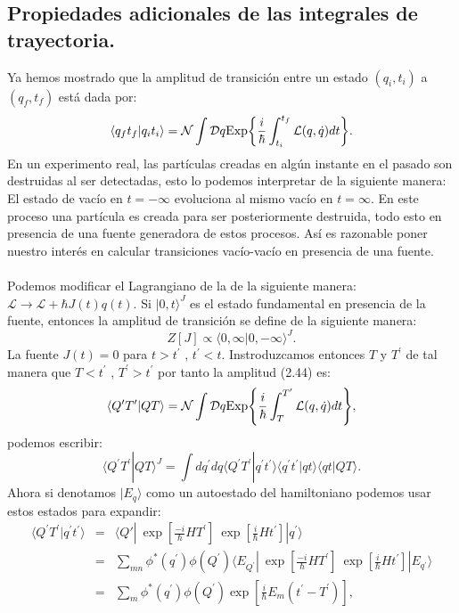 \subsection{Propiedades adicionales de las integrales de trayectoria.}
Ya hemos mostrado que la amplitud de transición entre un estado $(q_i,t_i)$ a $(q_f,t_f)$ está dada por:
\begin{equation}
\langle q_{f}t_{f}|q_it_i\rangle=\mathcal{N}\int\mathcal{D}q\text{Exp\ensuremath{\left\{ \frac{i}{\hbar}\int_{t_{i}}^{t_{f}}\mathcal{L}(q,\dot{q})dt\right\} }}.
\end{equation}
En un experimento real, las partículas creadas en algún instante en el pasado son destruidas al ser detectadas, esto lo podemos interpretar de la siguiente manera: El estado de vacío en $t=-\infty$ evoluciona al mismo vacío en $t=\infty$. En este proceso una partícula es creada para ser posteriormente destruida, todo esto en presencia de una fuente generadora de estos procesos. Así es razonable poner nuestro interés en calcular transiciones vacío-vacío en presencia de una fuente.\\
\\
Podemos modificar el Lagrangiano de la de la siguiente manera: $\mathcal{L} \to \mathcal{L}+\hbar J(t)q(t)$. Si $|0,t\rangle^J $ es el estado fundamental en presencia de la fuente, entonces la amplitud de transición se define de la siguiente manera:
\begin{equation}
Z[J]\propto \langle 0,\infty|0,-\infty\rangle ^J.
\end{equation}
La fuente $J(t)=0$ para $t>t^{\prime}$ , $t^{\prime} < t$. Instroduzcamos entonces $T$ y $T^{\prime} $ de tal manera que $T<t^{\prime} $ , $T^{\prime}>t^{\prime} $ por tanto la amplitud (2.44) es:
\begin{equation}
\langle 	Q^{\prime} T^{\prime} |QT\rangle=\mathcal{N}\int\mathcal{D}q\text{Exp\ensuremath{\left\{ \frac{i}{\hbar}\int_{T}^{T^{\prime}}\mathcal{L}(q,\dot{q})dt\right\} }},
\end{equation}
podemos escribir:
\begin{equation}
\langle Q^{\prime} T^{\prime} |QT \rangle^J=\int dq^{\prime} dq\langle Q^{\prime} T^{\prime} | q^{\prime} t^{\prime}  \rangle\langle q^{\prime} t^{\prime} | qt \rangle\langle qt|QT \rangle .
\end{equation}
Ahora si denotamos $|E_q\rangle$ como un autoestado del hamiltoniano podemos usar estos estados para expandir:
\begin{eqnarray}
\nonumber \langle Q^{\prime} T^{\prime} | q^{\prime} t^{\prime}  \rangle &=& \langle Q\prime|\ \exp\left[\frac{-i}{\hbar}HT^{\prime}\right]\ \exp\left[\frac{i}{\hbar}Ht^{\prime}\right]|q^{\prime}\rangle\\
\nonumber &=& \sum_{mn}\phi^{*}(q^{\prime})\phi(Q^{\prime})\langle E_{Q^{\prime}}|\ \exp\left[\frac{-i}{\hbar}HT^{\prime}\right]\ \exp\left[\frac{i}{\hbar}Ht^{\prime}\right]|E_{q^{\prime}}\rangle\\
&=&\sum_{m}\phi^{*}(q^{\prime})\phi(Q^{\prime}) \exp\left[\frac{i}{\hbar}E_{m}(t^{\prime}-T^{\prime})\right],
\end{eqnarray}
